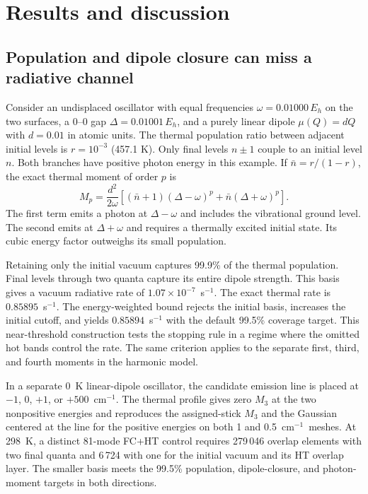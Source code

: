 \documentclass[11pt]{article}
\newcommand{\wn}{\ensuremath{\mathrm{cm}^{-1}}}
\begin{document}
\section{Results and discussion}

\subsection{Population and dipole closure can miss a radiative channel}
\label{sec:moment-test}

Consider an undisplaced oscillator with equal frequencies $\omega=0.01000\,E_h$ on the two surfaces, a 0--0 gap $\Delta=0.01001\,E_h$, and a purely linear dipole $\mu(Q)=dQ$ with $d=0.01$ in atomic units. The thermal population ratio between adjacent initial levels is $r=10^{-3}$ (457.1 K). Only final levels $n\pm1$ couple to an initial level $n$. Both branches have positive photon energy in this example. If $\bar n=r/(1-r)$, the exact thermal moment of order $p$ is
\begin{equation}
 M_p=\frac{d^2}{2\omega}\left[
  (\bar n+1)(\Delta-\omega)^p+\bar n(\Delta+\omega)^p
 \right].
 \label{eq:exact-ht-moment}
\end{equation}
The first term emits a photon at $\Delta-\omega$ and includes the vibrational ground level. The second emits at $\Delta+\omega$ and requires a thermally excited initial state. Its cubic energy factor outweighs its small population.

Retaining only the initial vacuum captures 99.9\% of the thermal population. Final levels through two quanta capture its entire dipole strength. This basis gives a vacuum radiative rate of $1.07\times10^{-7}$~s$^{-1}$. The exact thermal rate is $0.85895$~s$^{-1}$. The energy-weighted bound rejects the initial basis, increases the initial cutoff, and yields $0.85894$~s$^{-1}$ with the default 99.5\% coverage target. This near-threshold construction tests the stopping rule in a regime where the omitted hot bands control the rate. The same criterion applies to the separate first, third, and fourth moments in the harmonic model.

In a separate 0~K linear-dipole oscillator, the candidate emission line is placed at $-1$, $0$, $+1$, or $+500$~\wn. The thermal profile gives zero $M_3$ at the two nonpositive energies and reproduces the assigned-stick $M_3$ and the Gaussian centered at the line for the positive energies on both 1 and 0.5~\wn\ meshes. At 298~K, a distinct 81-mode FC+HT control requires 279\,046 overlap elements with two final quanta and 6\,724 with one for the initial vacuum and its HT overlap layer. The smaller basis meets the 99.5\% population, dipole-closure, and photon-moment targets in both directions.
\end{document}
